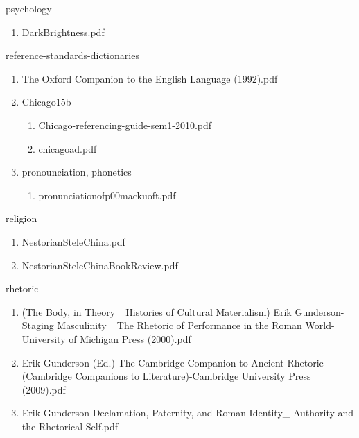 \documentclass[11pt]{article}
\begin{document}
\item psychology
\label{sec-1-1-1-1-39}
\begin{enumerate}
\item DarkBrightness.pdf
\label{sec-1-1-1-1-39-1}
\end{enumerate}

\item reference-standards-dictionaries
\label{sec-1-1-1-1-40}
\begin{enumerate}
\item The Oxford Companion to the English Language (1992).pdf
\label{sec-1-1-1-1-40-1}

\item Chicago15b
\label{sec-1-1-1-1-40-2}
\begin{enumerate}
\item Chicago-referencing-guide-sem1-2010.pdf
\label{sec-1-1-1-1-40-2-1}

\item chicagoad.pdf
\label{sec-1-1-1-1-40-2-2}
\end{enumerate}

\item pronounciation, phonetics
\label{sec-1-1-1-1-40-3}
\begin{enumerate}
\item pronunciationofp00mackuoft.pdf
\label{sec-1-1-1-1-40-3-1}
\end{enumerate}
\end{enumerate}

\item religion
\label{sec-1-1-1-1-41}
\begin{enumerate}
\item NestorianSteleChina.pdf
\label{sec-1-1-1-1-41-1}

\item NestorianSteleChinaBookReview.pdf
\label{sec-1-1-1-1-41-2}
\end{enumerate}

\item rhetoric
\label{sec-1-1-1-1-42}
\begin{enumerate}
\item (The Body, in Theory\_ Histories of Cultural Materialism) Erik Gunderson-Staging Masculinity\_ The Rhetoric of Performance in the Roman World-University of Michigan Press (2000).pdf
\label{sec-1-1-1-1-42-1}

\item Erik Gunderson (Ed.)-The Cambridge Companion to Ancient Rhetoric (Cambridge Companions to Literature)-Cambridge University Press (2009).pdf
\label{sec-1-1-1-1-42-2}

\item Erik Gunderson-Declamation, Paternity, and Roman Identity\_ Authority and the Rhetorical Self.pdf
\label{sec-1-1-1-1-42-3}
\end{enumerate}
\end{document}
